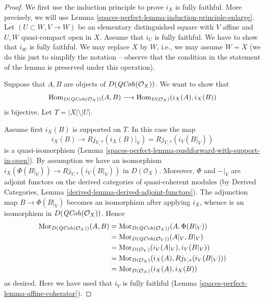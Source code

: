 \begin{proof}
We first use the induction principle to prove $i_X$ is fully faithful.
More precisely, we will use Lemma \ref{spaces-perfect-lemma-induction-principle-enlarge}.
Let $(U \subset W, V \to W)$ be an elementary distinguished square
with $V$ affine and $U, W$ quasi-compact open in $X$. Assume that
$i_U$ is fully faithful. We have to show that $i_W$ is fully faithful.
We may replace $X$ by $W$, i.e., we may assume $W = X$ (we do this just
to simplify the notation -- observe that the condition in the
statement of the lemma is preserved under this operation).

\medskip\noindent
Suppose that $A, B$ are objects of $D(\mathit{QCoh}(\mathcal{O}_X))$.
We want to show that
$$
\operatorname{Hom}_{D(\mathit{QCoh}(\mathcal{O}_X))}(A, B)
\longrightarrow
\operatorname{Hom}_{D(\mathcal{O}_X)}(i_X(A), i_X(B))
$$
is bijective. Let $T = |X| \setminus |U|$.

\medskip\noindent
Assume first $i_X(B)$ is supported on $T$. In this case the map
$$
i_X(B) \to Rj_{V, *}(i_X(B)|_V) = Rj_{V, *}(i_V(B|_V))
$$
is a quasi-isomorphism
(Lemma \ref{spaces-perfect-lemma-pushforward-with-support-in-open}).
By assumption we have an isomorphism
$i_X(\Phi(B|_V)) \to Rj_{V, *}(i_V(B|_V))$ in $D(\mathcal{O}_X)$.
Moreover, $\Phi$ and ${-}|_V$ are adjoint functors on the derived categories of
quasi-coherent modules (by
Derived Categories, Lemma \ref{derived-lemma-derived-adjoint-functors}).
The adjunction map $B \to \Phi(B|_V)$ becomes an isomorphism
after applying $i_X$, whence is an isomorphism in
$D(\mathit{QCoh}(\mathcal{O}_X))$.
Hence
\begin{align*}
\operatorname{Mor}_{D(\mathit{QCoh}(\mathcal{O}_X))}(A, B)
& =
\operatorname{Mor}_{D(\mathit{QCoh}(\mathcal{O}_X))}(A, \Phi(B|_V)) \\
& =
\operatorname{Mor}_{D(\mathit{QCoh}(\mathcal{O}_V))}(A|_V, B|_V) \\
& =
\operatorname{Mor}_{D(\mathcal{O}_V)}(i_V(A|_V), i_V(B|_V)) \\
& =
\operatorname{Mor}_{D(\mathcal{O}_X)}(i_X(A), Rj_{V, *}(i_V(B|_V))) \\
& =
\operatorname{Mor}_{D(\mathcal{O}_X)}(i_X(A), i_X(B))
\end{align*}
as desired. Here we have used that $i_V$ is fully faithful
(Lemma \ref{spaces-perfect-lemma-affine-coherator}).


\end{proof}
